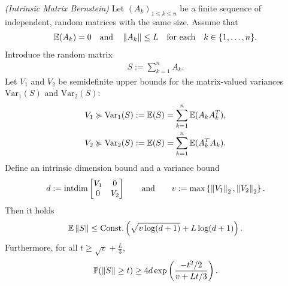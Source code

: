 \begin{theorem}
  \emph{(Intrinsic Matrix Bernstein)}
  \label{rmineq_bernstein}
  Let $(A_k)_{1\le k \le n}$  be a finite sequence of independent, random matrices with the same size. Assume that
    \begin{gather}
      \label{rmineq_bernstein_cond_1}
      \mathbb{E}(A_k)=0\quad\text{and}\quad\left\lVert A_k\right\rVert\le L \quad \text{for each}\quad  k\in \{1,\ldots,n\}.
    \end{gather}
  Introduce the random matrix
      \begin{gather*}
        S:=\sum_{k=1}^n A_k.
      \end{gather*}
  Let 
  $V_1$ 
  and
  $V_2$ 
  be semidefinite upper bounds for the matrix-valued variances
  $\text{Var}_1(S)$
  and
  $\text{Var}_2(S)$:
  \begin{align*}
    V_1 
    &\succcurlyeq 
    \text{Var}_1(S)
    :=
    \mathbb{E}(S)
    =
    \sum_{k = 1}^{n}
    \mathbb{E}(A_k A_k^T),\\
    V_2 
    &\succcurlyeq 
    \text{Var}_2(S)
    :=
    \mathbb{E}(S)
    =
    \sum_{k = 1}^{n}
    \mathbb{E}(A_k^T A_k)
    .
  \end{align*}
  Define an intrinsic dimension bound and a variance bound
  \begin{gather}
    \label{ rmineq_intrinsic_bernstein_intdim_var_bound }
    d
    :=
    \text{intdim}
    \begin{bmatrix}
      V_1 & 0 \\
      0   & V_2
    \end{bmatrix}
    \qquad
    \text{and}
    \qquad
    v
    :=
    \max
    \left\{ \left\lVert V_1\right\rVert_2, \left\lVert V_2\right\rVert_2 \right\}
    .
  \end{gather}
  Then 
  it holds
      \begin{align}
        \label{rmineq_intrinsic_bernstein_expectation_bound}
        \mathbb{E}\left\lVert S\right\rVert\le \text{Const.}\left( \sqrt{v\log(d+1)} + L\log(d+1) \right).
      \end{align}
    Furthermore, for all 
  $
    t
    \ge
    \sqrt{v}
    +
    \frac{L}{3}
  $,
      \begin{gather}
        \label{rmineq_intrinsic_bernstein_probability_bound}
        \mathbb{P}(\left\lVert S\right\rVert\ge t)\ge 4d \exp\left(\frac{-t^2/2}{v+Lt/3} \right).
      \end{gather}
\end{theorem}
